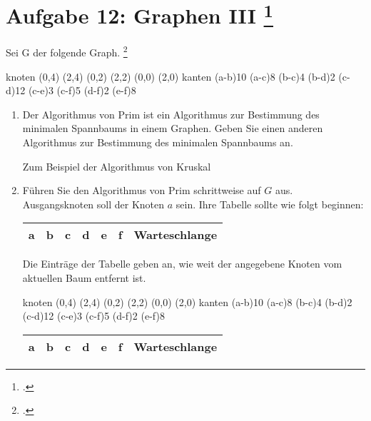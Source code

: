 \documentclass{lehramt-informatik-minimal}
\begin{document}
\section{Aufgabe 12: Graphen III
\footcite[(entnommen aus Algorithmen und Datenstrukturen, Übungsblatt 7, Universität Würzburg)]{aud:pu:7}}

Sei G der folgende Graph.
\footcite[Thema 2, Aufgabe 4 (gekürzt)]{examen:46115:2018:03}

\graph knoten {
  (0,4)
  (2,4)
  (0,2)
  (2,2)
  (0,0)
  (2,0)
} kanten {
  \kante(a-b){10}
  \kante(a-c){8}
  \kante(b-c){4}
  \kante(b-d){2}
  \kante(c-d){12}
  \kante(c-e){3}
  \kante(c-f){5}
  \kante(d-f){2}
  \kante(e-f){8}
}

\begin{enumerate}


\item Der Algorithmus von Prim ist ein Algorithmus zur Bestimmung des
minimalen Spannbaums in einem Graphen. Geben Sie einen anderen
Algorithmus zur Bestimmung des minimalen Spannbaums an.

\begin{antwort}
Zum Beispiel der Algorithmus von Kruskal
\end{antwort}


\item Führen Sie den Algorithmus von Prim schrittweise auf $G$ aus.
Ausgangsknoten soll der Knoten $a$ sein. Ihre Tabelle sollte wie folgt
beginnen:

\begin{tabular}{|l|l|l|l|l|l|l|}
\hline
a &
b &
c &
d &
e &
f &
Warteschlange\\\hline
\end{tabular}

Die Einträge der Tabelle geben an, wie weit der angegebene Knoten
vom aktuellen Baum entfernt ist.

\begin{antwort}
\graph knoten {
  (0,4)
  (2,4)
  (0,2)
  (2,2)
  (0,0)
  (2,0)
} kanten {
  \kante(a-b){10}
  \KANTE(a-c){8}
  \KANTE(b-c){4}
  \KANTE(b-d){2}
  \kante(c-d){12}
  \KANTE(c-e){3}
  \kante(c-f){5}
  \KANTE(d-f){2}
  \kante(e-f){8}
}

\begin{tabular}{|l|l|l|l|l|l|l|}
\hline
a &
b &
c &
d &
e &
f &
Warteschlange\\\hline\hline


\end{tabular}
\end{antwort}
\end{enumerate}
\end{document}
